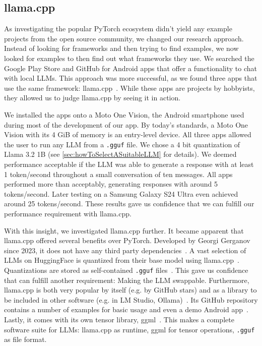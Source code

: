 \subsection{llama.cpp}
\label{sec:llamaCpp}
As investigating the popular PyTorch ecosystem didn't yield any example projects from the open source community, we changed our research approach. Instead of looking for frameworks and then trying to find examples, we now looked for examples to then find out what frameworks they use. We searched the Google Play Store and GitHub for Android apps that offer a functionality to chat with local \glspl{LLM}. This approach was more successful, as we found three apps that use the same framework: llama.cpp~\cite{panchalShubham0204SmolChatAndroid2025,vali-98Vali98ChatterUI2025,ghorbaniAghorbaniPocketpalai2025}. While these apps are projects by hobbyists, they allowed us to judge llama.cpp by seeing it in action.

We installed the apps onto a Moto One Vision, the Android smartphone used during most of the development of our app. By today's standards, a Moto One Vision with its 4 GiB of memory is an entry-level device. All three apps allowed the user to run any \gls{LLM} from a \lstinline|.gguf| file. We chose a 4 bit quantization of Llama 3.2 1B (see \cref{sec:howToSelectASuitableLLM} for details). We deemed performance acceptable if the \gls{LLM} was able to generate a response with at least 1 token/second throughout a small conversation of ten messages. All apps performed more than acceptably, generating responses with around 5 tokens/second. Later testing on a Samsung Galaxy S24 Ultra even achieved around 25 tokens/second. These results gave us confidence that we can fulfill our performance requirement with llama.cpp.

With this insight, we investigated llama.cpp further. It became apparent that llama.cpp offered several benefits over PyTorch. Developed by Georgi Gerganov since 2023, it does not have any third party dependencies~\cite{gerganovGgerganovLlamacpp2024}. A vast selection of \glspl{LLM} on HuggingFace is quantized from their base model using llama.cpp~\cite{huggingfaceModelsHuggingFace2025}. Quantizations are stored as self-contained \lstinline|.gguf| files~\cite{huggingfaceGGUF}. This gave us confidence that can fulfill another requirement: Making the \gls{LLM} swappable. Furthermore, llama.cpp is both very popular by itself (e.g. by GitHub stars) and as a library to be included in other software (e.g. in LM Studio, Ollama)~\cite{gerganovGgerganovLlamacpp2024}. Its GitHub repository contains a number of examples for basic usage and even a demo Android app~\cite{gerganovGgerganovLlamacpp2024}. Lastly, it comes with its own tensor library, ggml~\cite{gerganovGgerganovGgml2024}. This makes a complete software suite for \glspl{LLM}: llama.cpp as runtime, ggml for tensor operations, \lstinline|.gguf| as file format.

